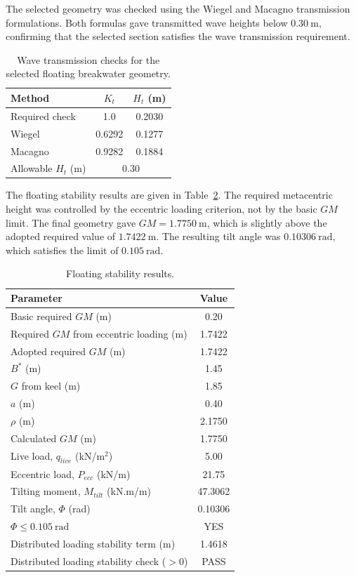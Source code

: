 \documentclass[a4paper, 11pt]{article}
\begin{document}
The selected geometry was checked using the Wiegel and Macagno transmission formulations. Both formulas gave transmitted wave heights below \(0.30~\mathrm{m}\), confirming that the selected section satisfies the wave transmission requirement.

\begin{table}[H]
\centering
\caption{Wave transmission checks for the selected floating breakwater geometry.}
\label{tab:floating_transmission}
\begin{tabular}{l c c}
\hline
Method & \(K_t\) & \(H_t\) (m) \\
\hline
Required check & 1.0 & 0.2030 \\
Wiegel & 0.6292 & 0.1277 \\
Macagno & 0.9282 & 0.1884 \\
\hline
Allowable \(H_t\) (m) & \multicolumn{2}{c}{0.30} \\
\hline
\end{tabular}
\end{table}

The floating stability results are given in Table~\ref{tab:floating_stability}. The required metacentric height was controlled by the eccentric loading criterion, not by the basic \(GM\) limit. The final geometry gave \(GM=1.7750~\mathrm{m}\), which is slightly above the adopted required value of \(1.7422~\mathrm{m}\). The resulting tilt angle was \(0.10306~\mathrm{rad}\), which satisfies the limit of \(0.105~\mathrm{rad}\).

\begin{table}[H]
\centering
\caption{Floating stability results.}
\label{tab:floating_stability}
\begin{tabular}{l c}
\hline
Parameter & Value \\
\hline
Basic required \(GM\) (m) & 0.20 \\
Required \(GM\) from eccentric loading (m) & 1.7422 \\
Adopted required \(GM\) (m) & 1.7422 \\
\(B^*\) (m) & 1.45 \\
\(G\) from keel (m) & 1.85 \\
\(a\) (m) & 0.40 \\
\(\rho\) (m) & 2.1750 \\
Calculated \(GM\) (m) & 1.7750 \\
Live load, \(q_{live}\) (kN/m\(^2\)) & 5.00 \\
Eccentric load, \(P_{ecc}\) (kN/m) & 21.75 \\
Tilting moment, \(M_{tilt}\) (kN.m/m) & 47.3062 \\
Tilt angle, \(\Phi\) (rad) & 0.10306 \\
\(\Phi \leq 0.105~\mathrm{rad}\) & YES \\
Distributed loading stability term (m) & 1.4618 \\
Distributed loading stability check ($>0$) & PASS \\
\hline
\end{tabular}
\end{table}
\end{document}
